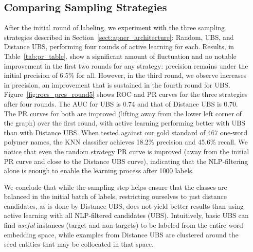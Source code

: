 \subsection{Comparing Sampling Strategies}
After the initial round of labeling, we experiment with the three sampling strategies described in Section~\ref{sect:apner_architecture}: Random, UBS, and Distance UBS,
performing four rounds of active learning for each.
Results, in Table~\ref{tab:pr_table}, show a significant amount of fluctuation and
no notable improvement in the first two rounds for any strategy: %
precision remains under the initial precision of 6.5\% for all.
However, in the third round, we observe increases in precision,
an improvement that  
is sustained in the fourth round for UBS.
Figure~\ref{fig:rocs_prcs_round5} shows ROC and PR curves for the three strategies after four rounds. 
The AUC for UBS is 0.74 and that of Distance UBS is 0.70. 
The PR curves for both are improved (lifting away from the lower left corner of the graph) over the first round, 
with active learning performing better with UBS than with Distance UBS.
When tested against our gold standard of 467 one-word polymer names, 
the KNN classifier achieves 18.2\% precision and  45.6\% recall. 
We notice that even the random strategy PR curve is improved (away from the initial PR curve and close to the Distance UBS curve), indicating that the NLP-filtering alone is enough to enable the learning process after 1000 labels.

We conclude that while the sampling step
helps ensure that the classes are balanced in the initial batch of labels, 
restricting ourselves to just distance candidates, as is done by Distance UBS, does not yield better results than using active learning with all NLP-filtered candidates (UBS).
Intuitively, basic UBS can find \textit{useful} instances (target and non-targets) to be labeled from the entire word embedding space, 
while examples from Distance UBS are clustered around the seed entities that may be collocated in that space.


